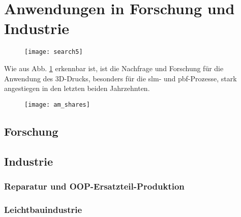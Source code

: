 \documentclass[../main.tex]{subfiles}
\begin{document}
\section{Anwendungen in Forschung und Industrie}
\begin{figure}[H]
	\centering
	\texttt{[image: search5]}
	\label{img:search_5}
\end{figure}
Wie aus Abb. \ref{img:search_5} erkennbar ist, ist die Nachfrage und Forschung für die Anwendung des 3D-Drucks, besonders für die \acrlong{slm}- und \acrfull{pbf}-Prozesse, stark angestiegen in den letzten beiden Jahrzehnten.

\begin{figure}[H]
	\centering
	\texttt{[image: am\_shares]}
	\label{img:am_shares}
\end{figure} 
\subsection{Forschung}
\subsection{Industrie}
\subsubsection{Reparatur und OOP-Ersatzteil-Produktion}
\subsubsection{Leichtbauindustrie}
\end{document}
